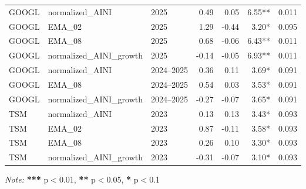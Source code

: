 \begin{table}[H]
{\begin{tabular}{l l l r r r r}
GOOGL & normalized\_AINI & 2025 & 0.49 & 0.05 & 6.55** & 0.011 \\
GOOGL & EMA\_02 & 2025 & 1.29 & -0.44 & 3.20* & 0.095 \\
GOOGL & EMA\_08 & 2025 & 0.68 & -0.06 & 6.43** & 0.011 \\
GOOGL & normalized\_AINI\_growth & 2025 & -0.14 & -0.05 & 6.93** & 0.011 \\
GOOGL & normalized\_AINI & 2024--2025 & 0.36 & 0.11 & 3.69* & 0.091 \\
GOOGL & EMA\_08 & 2024--2025 & 0.54 & 0.03 & 3.53* & 0.091 \\
GOOGL & normalized\_AINI\_growth & 2024--2025 & -0.27 & -0.07 & 3.65* & 0.091 \\
TSM & normalized\_AINI & 2023 & 0.13 & 0.13 & 3.43* & 0.093 \\
TSM & EMA\_02 & 2023 & 0.87 & -0.11 & 3.58* & 0.093 \\
TSM & EMA\_08 & 2023 & 0.26 & 0.10 & 3.30* & 0.093 \\
TSM & normalized\_AINI\_growth & 2023 & -0.31 & -0.07 & 3.10* & 0.093 \\
\bottomrule
\end{tabular}

}
\vspace{0.2cm}
\textit{Note:} \textbf{***} p$<$0.01, \textbf{**} p$<$0.05, \textbf{*} p$<$0.1
\end{table}